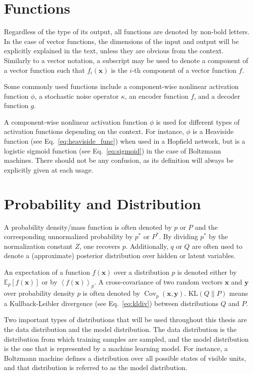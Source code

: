\documentclass{now}
\newcommand{\vect}[1]{\mathbf{#1}}
\newcommand{\cov}[0]{\operatorname{Cov}}
\newcommand{\vx}[0]{\vect{x}}
\newcommand{\vy}[0]{\vect{y}}
\newcommand{\KL}[0]{\text{KL}}
\newcommand{\E}[0]{\mathbb{E}}
\begin{document}
\section*{Functions}

Regardless of the type of its output, all functions are denoted by non-bold
letters. In the case of vector functions, the dimensions of the input and
output will be explicitly explained in the text, unless they are obvious from
the context. Similarly to a vector notation, a subscript may be used to denote
a component of a vector function such that $f_i(\vx)$ is the $i$-th component
of a vector function $f$.

Some commonly used functions include a component-wise nonlinear activation
function $\phi$, a stochastic noise operator $\kappa$, an encoder function $f$,
and a decoder function $g$.

A component-wise nonlinear activation function $\phi$ is used for different
types of activation functions depending on the context. For instance, $\phi$ is
a Heaviside function (see Eq.~\eqref{eq:heaviside_func}) when used in a
Hopfield network, but is a logistic sigmoid function (see
Eq.~\eqref{eq:sigmoid}) in the case of Boltzmann machines.  There should not be
any confusion, as its definition will always be explicitly given at each usage.

\section*{Probability and Distribution}

A probability density/mass function is often denoted by $p$ or $P$ and the
corresponding unnormalized probability by $p^*$ or $P^*$.  By dividing $p^*$ by
the normalization constant $Z$, one recovers $p$. Additionally, $q$ or $Q$ are
often used to denote a (approximate) posterior distribution over hidden or
latent variables. 

An expectation of a function $f(\vx)$ over a distribution $p$ is denoted either
by $\E_p\left[ f(\vx) \right]$ or by $\left< f(\vx) \right>_p$. A
cross-covariance of two random vectors $\vx$ and $\vy$ over probability density
$p$ is often denoted by $\cov_p(\vx, \vy)$. $\KL\left( Q \| P \right)$ means a
Kullback-Leibler divergence (see Eq.~\eqref{eq:kldiv}) between distributions
$Q$ and $P$.

Two important types of distributions that will be used throughout this thesis
are the data distribution and the model distribution.  The data distribution is
the distribution from which training samples are sampled, and the model
distribution is the one that is represented by a machine learning model. For
instance, a Boltzmann machine defines a distribution over all possible states
of visible units, and that distribution is referred to as the model
distribution.
\end{document}
